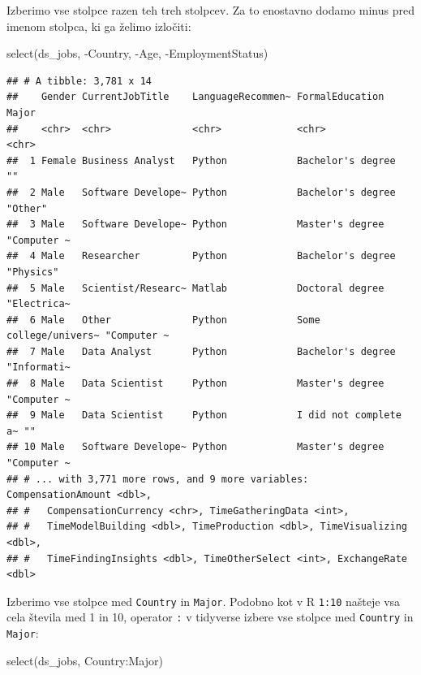 \documentclass[
]{book}
\newenvironment{Shaded}{\begin{snugshade}}{\end{snugshade}}
\newcommand{\FunctionTok}[1]{\textcolor[rgb]{0.00,0.00,0.00}{#1}}
\newcommand{\NormalTok}[1]{#1}
\newcommand{\SpecialCharTok}[1]{\textcolor[rgb]{0.00,0.00,0.00}{#1}}
\begin{document}
Izberimo vse stolpce razen teh treh stolpcev. Za to enostavno dodamo minus pred imenom stolpca, ki ga želimo izločiti:

\begin{Shaded}
\begin{Highlighting}[]
\FunctionTok{select}\NormalTok{(ds\_jobs, }\SpecialCharTok{{-}}\NormalTok{Country, }\SpecialCharTok{{-}}\NormalTok{Age, }\SpecialCharTok{{-}}\NormalTok{EmploymentStatus)}
\end{Highlighting}
\end{Shaded}

\begin{verbatim}
## # A tibble: 3,781 x 14
##    Gender CurrentJobTitle    LanguageRecommen~ FormalEducation       Major      
##    <chr>  <chr>              <chr>             <chr>                 <chr>      
##  1 Female Business Analyst   Python            Bachelor's degree     ""         
##  2 Male   Software Develope~ Python            Bachelor's degree     "Other"    
##  3 Male   Software Develope~ Python            Master's degree       "Computer ~
##  4 Male   Researcher         Python            Bachelor's degree     "Physics"  
##  5 Male   Scientist/Researc~ Matlab            Doctoral degree       "Electrica~
##  6 Male   Other              Python            Some college/univers~ "Computer ~
##  7 Male   Data Analyst       Python            Bachelor's degree     "Informati~
##  8 Male   Data Scientist     Python            Master's degree       "Computer ~
##  9 Male   Data Scientist     Python            I did not complete a~ ""         
## 10 Male   Software Develope~ Python            Master's degree       "Computer ~
## # ... with 3,771 more rows, and 9 more variables: CompensationAmount <dbl>,
## #   CompensationCurrency <chr>, TimeGatheringData <int>,
## #   TimeModelBuilding <dbl>, TimeProduction <dbl>, TimeVisualizing <dbl>,
## #   TimeFindingInsights <dbl>, TimeOtherSelect <int>, ExchangeRate <dbl>
\end{verbatim}

Izberimo vse stolpce med \texttt{Country} in \texttt{Major}. Podobno kot v R \texttt{1:10} našteje vsa cela števila med 1 in 10, operator \texttt{:} v tidyverse izbere vse stolpce med \texttt{Country} in \texttt{Major}:

\begin{Shaded}
\begin{Highlighting}[]
\FunctionTok{select}\NormalTok{(ds\_jobs, Country}\SpecialCharTok{:}\NormalTok{Major)}
\end{Highlighting}
\end{Shaded}
\end{document}
